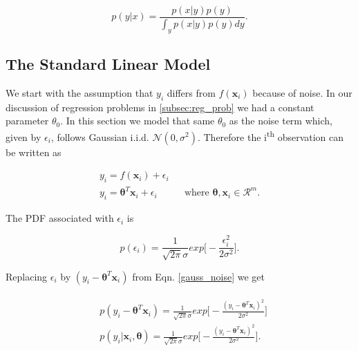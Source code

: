 \documentclass[english]{tktltiki}
\begin{document}
\begin{equation}
p(y|x) = \frac{p(x|y)p(y)}{\int_y{p(x|y)p(y)dy}}.
\end{equation}

\subsection{The Standard Linear Model}

We start with the assumption that $y_i$ differs from $f(\mathbf{x}_i)$ because of noise. In our discussion of regression problems in \ref{subsec:reg_prob} we had a constant parameter $\theta_0$. In this section we model that same $\theta_0$ as the noise term which, given by $\epsilon_i$, follows Gaussian i.i.d. $\mathcal{N}(0, \sigma ^2)$. Therefore the i\textsuperscript{th} observation can be written as

\begin{eqnarray}
\label{eqn:standard_linear_model}
y_i = f(\mathbf{x}_i) + \epsilon_i \nonumber \\
y_i = \boldsymbol\theta ^T \mathbf{x}_i + \epsilon_i && \text{where $\boldsymbol\theta, \mathbf{x}_i \in \mathcal{R}^m$}.
\label{gauss_noise}
\end{eqnarray}

The PDF associated with $\epsilon_i$ is

\begin{equation}
p(\epsilon_i) = \frac{1}{\sqrt{2 \pi} \sigma} exp \Big[-\frac{\epsilon_i^2}{2 \sigma^2} \Big].
\end{equation}


Replacing $\epsilon_i$ by $(y_i - \boldsymbol\theta ^T \mathbf{x}_i)$ from Eqn. \ref{gauss_noise} we get

\begin{eqnarray}
\begin{split}
	&p(y_i - \boldsymbol\theta ^T \mathbf{x}_i) = \frac{1}{\sqrt{2 \pi} \sigma} exp \Big[-\frac{(y_i - \boldsymbol\theta ^T \mathbf{x}_i)^2}{2 \sigma^2} \Big] \\
	&p(y_i | \mathbf{x}_i, \boldsymbol\theta) = \frac{1}{\sqrt{2 \pi} \sigma} exp \Big[-\frac{(y_i - \boldsymbol\theta ^T \mathbf{x}_i)^2}{2 \sigma^2} \Big].
\end{split}
\end{eqnarray}
\end{document}
